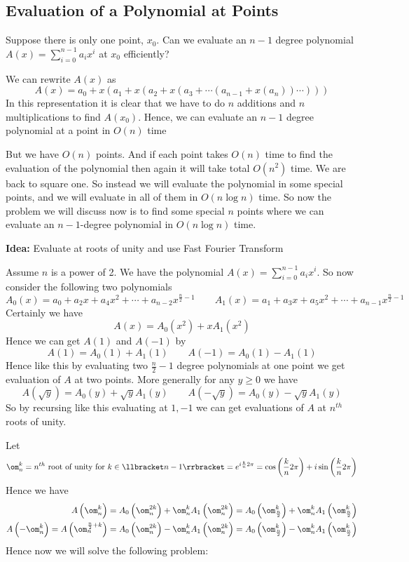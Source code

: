 \subsection{Evaluation of a Polynomial at Points}\label{fft}
\begin{question}{}{}
	Suppose there is only one point, $x_0$. Can we evaluate an $n-1$ degree polynomial $A(x)=\sum\limits_{i=0}^{n-1}a_ix^i$ at $x_0$ efficiently?
\end{question}
We can rewrite $A(x)$ as $$A(x)=a_0+x(a_1+x(a_2+x(a_3+\cdots (a_{n-1}+x(a_n))\cdots )))$$In this representation it is clear that we have to do $n$ additions and $n$ multiplications to find $A(x_0)$. Hence, we can evaluate an $n-1$ degree polynomial at a point in $O(n)$ time


But we have $O(n)$ points. And if each point takes $O(n)$ time to find the evaluation of the polynomial then again it will take total $O(n^2)$ time. We are back to square one. So instead we will evaluate the polynomial in some special points, and we will evaluate in all of them in $O(n\log n)$ time. So now the problem we will discuss now is to find some special $n$ points where we can evaluate an $n-1$-degree polynomial in $O(n\log n)$ time.
\parinf

\textbf{Idea:} Evaluate at roots of unity and use Fast Fourier Transform
\parinn

Assume $n$ is a power of 2. We have the polynomial $A(x)=\sum\limits_{i=0}^{n-1}a_ix^i$. So now consider the following two polynomials $$A_0(x)=a_0+a_2x+a_4x^2+\cdots+a_{n-2}x^{\frac{n}2-1}\qquad A_1(x)=a_1+a_3x+a_5x^2+\cdots+a_{n-1}x^{\frac{n}2-1}$$Certainly we have $$A(x)=A_0(x^2)+xA_1(x^2)$$Hence we can get $A(1)$ and $A(-1)$ by $$A(1)=A_0(1)+A_1(1)\qquad A(-1)=A_0(1)-A_1(1)$$Hence like this by evaluating two $\frac{n}2-1$ degree polynomials at one point we get evaluation of $A$ at two points. More generally for any $y\geq 0$ we have$$A(\sqrt{y})=A_0(y)+\sqrt{y}A_1(y)\qquad A(-\sqrt{y})=A_0(y)-\sqrt{y}A_1(y)$$So by recursing like this evaluating at $1,-1$ we can get evaluations of $A$ at $n^{th}$ roots of unity.

Let $$\om_n^k=n^{th}\text{ root of unity for }k\in\llbracket n-1\rrbracket = e^{i\frac{k}{n}2\pi}=\cos\lt(\frac{k}{n}2\pi\rt)+i\sin\lt(\frac{k}{n}2\pi\rt)$$Hence we have \begin{align*}
	A\lt(\om_n^k\rt)                               & =A_0\lt(\om_n^{2k}\rt)+\om_n^kA_1\lt(\om_n^{2k}\rt)=A_0\lt(\om_{\frac{n}2}^{k}\rt)+\om_n^kA_1\lt(\om_{\frac{n}2}^{k}\rt) \\
	A\lt(-\om_n^k\rt)=A\lt(\om_n^{\frac{n}2+k}\rt) & =A_0\lt(\om_n^{2k}\rt)-\om_n^kA_1\lt(\om_n^{2k}\rt)=A_0\lt(\om_{\frac{n}2}^{k}\rt)-\om_n^kA_1\lt(\om_{\frac{n}2}^{k}\rt)
\end{align*}Hence now we will solve the following problem:
\begin{algoprob}
\end{algoprob}

